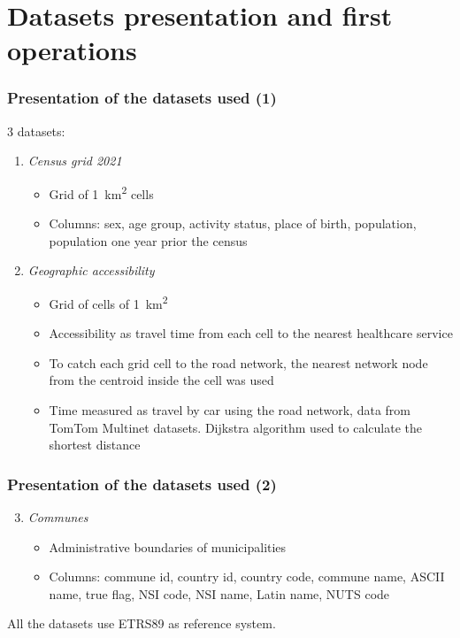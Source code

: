\section{Datasets presentation and first operations}

\begin{frame}
	\frametitle{Presentation of the datasets used (1)}
	
	3 datasets:
	\begin{enumerate}
		\item \emph{Census grid 2021}\\
			\begin{itemize}
				\item Grid of \qty{1}{km^2} cells
				\item Columns: sex, age group, activity status, place of birth, population, population one year prior the census
			\end{itemize}
			
		\item \emph{Geographic accessibility}\\
		\begin{itemize}
			\item Grid of cells of \qty{1}{km^2}
			\item Accessibility as travel time from each cell to the nearest healthcare service
			\item To catch each grid cell to the road network, the nearest network node from the centroid inside the cell was used
			\item Time measured as travel by car using the road network, data from TomTom Multinet datasets.
			Dijkstra algorithm used to calculate the shortest distance
		\end{itemize}
		
	\end{enumerate}
	
\end{frame}


\begin{frame}
	\frametitle{Presentation of the datasets used (2)}
	
	\begin{enumerate}
		\setcounter{enumi}{2}
		\item \emph{Communes}
			\begin{itemize}
				\item Administrative boundaries of municipalities
				\item Columns: commune id, country id, country code, commune name, ASCII name, true flag, NSI code, NSI name, Latin name, NUTS code
			\end{itemize}
	\end{enumerate}
	\medskip
	
	All the datasets use ETRS89 as reference system.
	
\end{frame}


